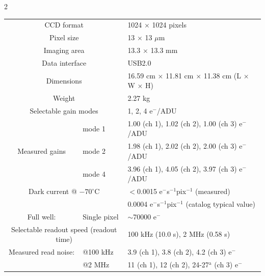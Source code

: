 \documentclass[a4paper,12pt]{spieman}  %
\begin{document}
\begin{spacing}{2}
\begin{table}
\begin{center}
\begin{tabular}{clll}
\multicolumn{2}{c}{CCD format} & \multicolumn{2}{l}{1024 $\times$ 1024 pixels}\\

\multicolumn{2}{c}{Pixel size} & \multicolumn{2}{l}{13 $\times$ 13 $\mu$m}\\

\multicolumn{2}{c}{Imaging area} & \multicolumn{2}{l}{13.3 $\times$ 13.3 mm}\\

\multicolumn{2}{c}{Data interface} & \multicolumn{2}{l}{USB2.0}\\

\multicolumn{2}{c}{Dimensions} & \multicolumn{2}{l}{16.59 cm $\times$ 11.81 cm $\times$ 11.38 cm (L $\times$ W $\times$ H) }\\ 

\multicolumn{2}{c}{Weight} & \multicolumn{2}{l}{2.27 kg }\\ 

\hline

\multicolumn{2}{c}{Selectable gain modes}& \multicolumn{2}{l}{1, 2, 4 e$^-$/ADU}\\

 & mode 1 & \multicolumn{2}{l}{1.00 (ch 1), 1.02 (ch 2), 1.00 (ch 3) e$^-$/ADU}\\
Measured gains & mode 2 & \multicolumn{2}{l}{1.98 (ch 1), 2.02 (ch 2), 2.00 (ch 3) e$^-$/ADU}\\
 & mode 4 & \multicolumn{2}{l}{3.96 (ch 1), 4.05 (ch 2), 3.97 (ch 3) e$^-$/ADU}\\

\multicolumn{2}{c}{Dark current @ $-70^\circ$C}& \multicolumn{2}{l}{$<$0.0015 e$^-$s$^{-1}$pix$^{-1}$ (measured)}\\
&& \multicolumn{2}{l}{0.0004 e$^-$s$^{-1}$pix$^{-1}$ (catalog typical value)}\\

Full well: & Single pixel & \multicolumn{2}{l}{$\sim$70000 e$^-$}\\

\multicolumn{2}{c}{Selectable readout speed (readout time)}& \multicolumn{2}{l}{100 kHz (10.0 s), 2 MHz (0.58 s)}\\

Measured read noise: & @100 kHz & \multicolumn{2}{l}{3.9 (ch 1), 3.8 (ch 2), 4.2 (ch 3) e$^-$}\\

 & @2 MHz & \multicolumn{2}{l}{11 (ch 1), 12 (ch 2), 24-27$^\mathrm{a}$ (ch 3) e$^-$}\\


\end{tabular}
\end{center}
\end{table}
\end{spacing}
\end{document}
